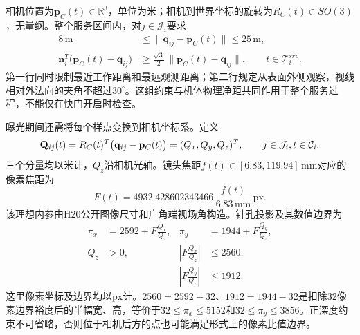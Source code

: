相机位置为$\mathbf p_C(t)\in\mathbb R^3$，单位为米；相机到世界坐标的旋转为$R_C(t)\in SO(3)$，无量纲。整个服务区间内，对$j\in\mathcal J_i$要求
\begin{align}
 8\,\mathrm m
 &\le\|\mathbf q_{ij}-\mathbf p_C(t)\|
 \le25\,\mathrm m,\\
 \mathbf n_i^T\bigl(\mathbf p_C(t)-\mathbf q_{ij}\bigr)
 &\ge\frac{\sqrt3}{2}\,
 \|\mathbf p_C(t)-\mathbf q_{ij}\|,
 \qquad t\in\mathcal T_i^{srv}.
 \label{s0602:service_geometry}
\end{align}
第一行同时限制最近工作距离和最远观测距离；第二行规定从表面外侧观察，视线相对外法向的夹角不超过$30^\circ$。这组约束与机体物理净距共同作用于整个服务过程，不能仅在快门开启时检查。

曝光期间还需将每个样点变换到相机坐标系。定义
\begin{equation}
 \mathbf Q_{ij}(t)=R_C(t)^T\bigl(\mathbf q_{ij}-\mathbf p_C(t)\bigr)
 =(Q_x,Q_y,Q_z)^T,
 \qquad j\in\mathcal J_i,\\ t\in\mathcal C_i.
 \label{s0602:camera_coordinates}
\end{equation}
三个分量均以米计，$Q_z$沿相机光轴。镜头焦距$f(t)\in[6.83,119.94]\,\mathrm{mm}$对应的像素焦距为
\begin{equation}
 F(t)=4932.428602343466\,
 \frac{f(t)}{6.83\,\mathrm{mm}}\,\mathrm{px}.
 \label{s0602:pixel_focal}
\end{equation}
该理想内参由H20公开图像尺寸和广角端视场角构造\cite{DJIH20}。针孔投影及其数值边界为
\begin{align}
 \pi_x&=2592+F\frac{Q_x}{Q_z},&
 \pi_y&=1944+F\frac{Q_y}{Q_z},\\
 Q_z&>0,&
 \left|F\frac{Q_x}{Q_z}\right|&\le2560,\\
 &&\left|F\frac{Q_y}{Q_z}\right|&\le1912.
 \label{s0602:pixel_bounds}
\end{align}
这里像素坐标及边界均以$\mathrm{px}$计。$2560=2592-32$、$1912=1944-32$是扣除32像素边界裕度后的半幅宽、高，等价于$32\le\pi_x\le5152$和$32\le\pi_y\le3856$。正深度约束不可省略，否则位于相机后方的点也可能满足形式上的像素比值边界。

